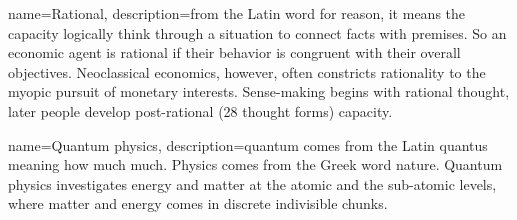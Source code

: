 {
  name=Rational,
  description={from the Latin word for reason, it means the capacity logically think through a situation to connect facts with premises. So an economic agent is rational if their behavior is congruent with their overall objectives. Neoclassical economics, however, often constricts rationality to the myopic pursuit of monetary interests. Sense-making begins with rational thought, later people develop post-rational (28 thought forms) capacity.}
}




{
  name=Quantum physics,
  description={quantum comes from the Latin quantus meaning how much much. Physics comes from the Greek word nature. Quantum physics investigates energy and matter at the atomic and the sub-atomic levels, where matter and energy comes in discrete indivisible chunks.}
}